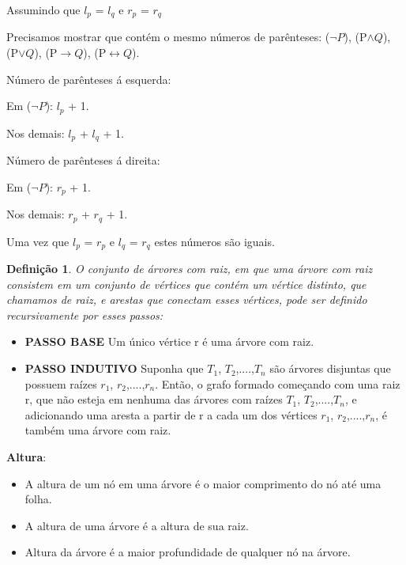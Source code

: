 \documentclass[a4paper, 10pt]{article}
\begin{document}
  Assumindo que  $l_{p}$ = $l_{q}$ e $r_{p}$ = $r_{q}$

  Precisamos mostrar que contém o mesmo números de parênteses:
  ($\neg P$), (P$\wedge Q$), (P$\vee Q$), (P$\to Q$), (P$\leftrightarrow Q$).

  Número de parênteses á esquerda:

  Em ($\neg P$): $l_{p}$ + 1.

  Nos demais: $l_{p}$ + $l_{q}$ + 1.

  Número de parênteses á direita:

  Em ($\neg P$): $r_{p}$ + 1.

  Nos demais: $r_{p}$ + $r_{q}$ + 1.

  Uma vez que $l_{p}$ =  $r_{p}$ e $l_{q}$ =  $r_{q}$ estes números são iguais.
  \newtheorem{mydef}{Definição}
\begin{mydef}
O conjunto de árvores com raiz, em que uma árvore com raiz consistem em um conjunto de vértices que contém um vértice distinto, que chamamos de raiz, e arestas que conectam esses vértices, pode ser definido recursivamente por esses passos:
\end{mydef}
\begin{itemize}
    \item \textbf{PASSO BASE} Um único vértice r é uma árvore com raiz.
    \item \textbf{PASSO INDUTIVO} Suponha que $T_{1}$, $T_{2}$,....,$T_{n}$ são árvores disjuntas que possuem raízes $r_{1}$, $r_{2}$,....,$r_{n}$. Então, o grafo formado começando com uma raiz r, que não esteja em nenhuma das árvores com raízes $T_{1}$, $T_{2}$,....,$T_{n}$, e adicionando uma aresta a partir de r a cada um dos vértices $r_{1}$, $r_{2}$,....,$r_{n}$, é também uma árvore com raiz.
\end{itemize}
\textbf{Altura}:
\begin{itemize}
    \item A altura de um nó em uma árvore é o maior comprimento do nó até uma folha.
    \item A altura de uma árvore é a altura de sua raiz.
    \item Altura da árvore é a maior profundidade de qualquer nó na árvore.
\end{itemize}
\newpage
\end{document}
